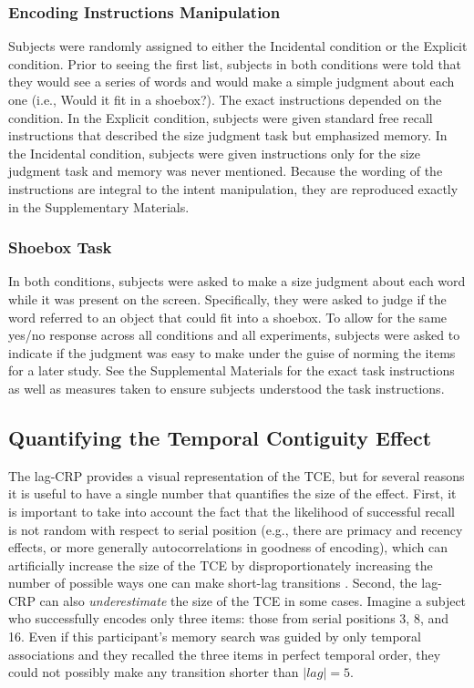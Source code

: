 \documentclass[man,natbib,floatsintext]{apa6} %
\begin{document}
\subsubsection{Encoding Instructions Manipulation} Subjects were randomly assigned to either the Incidental condition or the Explicit condition. Prior to seeing the first list, subjects in both conditions were told that they would see a series of words and would make a simple judgment about each one (i.e., Would it fit in a shoebox?). The exact instructions depended on the condition. In the Explicit condition, subjects were given standard free recall instructions that described the size judgment task but emphasized memory. In the Incidental condition, subjects were given instructions only for the size judgment task and memory was never mentioned. Because the wording of the instructions are integral to the intent manipulation, they are reproduced exactly in the Supplementary Materials.

\subsubsection{Shoebox Task} In both conditions, subjects were asked to make a size judgment about each word while it was present on the screen. Specifically, they were asked  to judge if the word referred to an object that could fit into a shoebox. To allow for the same yes/no response across all conditions and all experiments, subjects were asked to indicate if the judgment was easy to make under the guise of norming the items for a later study. See the Supplemental Materials for the exact task instructions as well as measures taken to ensure subjects understood the task instructions.

\subsection{Quantifying the Temporal Contiguity Effect} 
The lag-CRP provides a visual representation of the TCE, but for several reasons it is useful to have a single number that quantifies the size of the effect. First, it is important to take into account the fact that the likelihood of successful recall is not random with respect to serial position (e.g., there are primacy and recency effects, or more generally autocorrelations in goodness of encoding), which can artificially increase the size of the TCE by disproportionately increasing the number of possible ways one can make short-lag transitions \citep{HealKaha17,Hint16}. Second, the lag-CRP can also \emph{underestimate} the size of the TCE in some cases. Imagine a subject who successfully encodes only three items: those from serial positions 3, 8, and 16. Even if this participant's memory search was guided by only temporal associations and they recalled the three items in perfect temporal order, they could not possibly make any transition shorter than $|lag|=5$.
\end{document}
